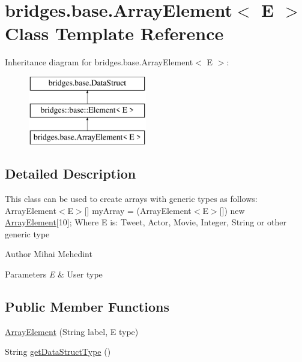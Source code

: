 \hypertarget{classbridges_1_1base_1_1_array_element}{}\section{bridges.\+base.\+Array\+Element$<$ E $>$ Class Template Reference}
\label{classbridges_1_1base_1_1_array_element}
Inheritance diagram for bridges.\+base.\+Array\+Element$<$ E $>$\+:\begin{figure}[H]
\begin{center}
\leavevmode
\includegraphics[height=3.000000cm]{classbridges_1_1base_1_1_array_element}
\end{center}
\end{figure}


\subsection{Detailed Description}
This class can be used to create arrays with generic types as follows\+: Array\+Element$<$\+E$>$\mbox{[}\mbox{]} my\+Array = (Array\+Element$<$\+E$>$\mbox{[}\mbox{]}) new \mbox{\hyperlink{classbridges_1_1base_1_1_array_element}{Array\+Element}}\mbox{[}10\mbox{]}; Where E is\+: Tweet, Actor, Movie, Integer, String or other generic type

\begin{DoxyAuthor}{Author}
Mihai Mehedint 
\end{DoxyAuthor}

\begin{DoxyParams}{Parameters}
{\em E} & User type \\
\hline
\end{DoxyParams}
\subsection*{Public Member Functions}
\begin{DoxyCompactItemize}
\item 
\mbox{\hyperlink{classbridges_1_1base_1_1_array_element_a90cbba952d50ff26fd2b89e9f3f81322}{Array\+Element}} (String label, E type)
\item 
String \mbox{\hyperlink{classbridges_1_1base_1_1_array_element_a1d4f3fae7bd986237e364c2cce0bea77}{get\+Data\+Struct\+Type}} ()
\end{DoxyCompactItemize}
